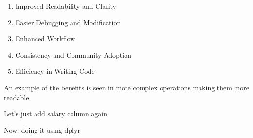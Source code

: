 \documentclass[
]{book}
\newenvironment{Shaded}{\begin{snugshade}}{\end{snugshade}}
\newcommand{\CommentTok}[1]{\textcolor[rgb]{0.56,0.35,0.01}{\textit{#1}}}
\newcommand{\DecValTok}[1]{\textcolor[rgb]{0.00,0.00,0.81}{#1}}
\newcommand{\FunctionTok}[1]{\textcolor[rgb]{0.13,0.29,0.53}{\textbf{#1}}}
\newcommand{\NormalTok}[1]{#1}
\newcommand{\OtherTok}[1]{\textcolor[rgb]{0.56,0.35,0.01}{#1}}
\newcommand{\SpecialCharTok}[1]{\textcolor[rgb]{0.81,0.36,0.00}{\textbf{#1}}}
\newcommand{\StringTok}[1]{\textcolor[rgb]{0.31,0.60,0.02}{#1}}
\providecommand{\tightlist}{%
  \setlength{\itemsep}{0pt}\setlength{\parskip}{0pt}}
\begin{document}
\begin{enumerate}
\def\labelenumi{\arabic{enumi}.}
\tightlist
\item
  Improved Readability and Clarity
\item
  Easier Debugging and Modification
\item
  Enhanced Workflow
\item
  Consistency and Community Adoption
\item
  Efficiency in Writing Code
\end{enumerate}

An example of the benefits is seen in more complex operations making them more readable

Let's just add salary column again.

\begin{Shaded}
\end{Shaded}

Now, doing it using dplyr
\end{document}
